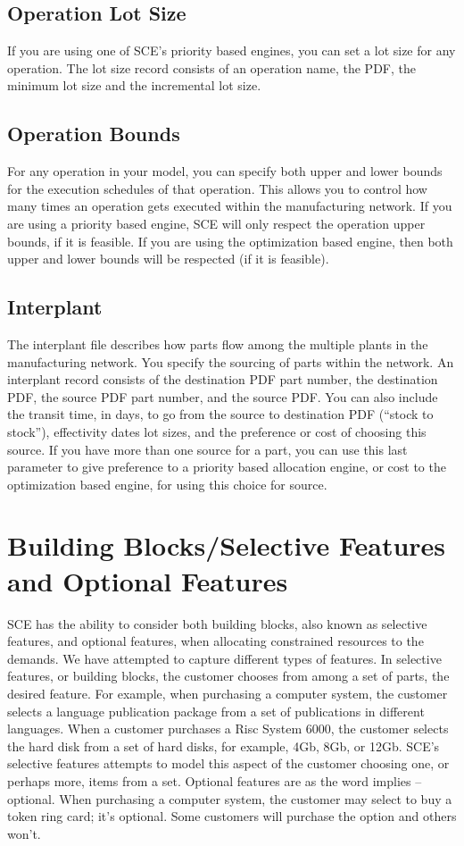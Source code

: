 \subsection{Operation Lot Size}
If you are using one of SCE's priority based engines, you can set a
lot size for any operation.  The lot size record consists of an
operation name, the PDF, the minimum lot size and the incremental lot
size.

\subsection{Operation Bounds}
For any operation in your model, you can specify both upper and lower
bounds for the execution schedules of that operation.  This allows you
to control how many times an operation gets executed within the
manufacturing network. 
If you are using a priority based engine, SCE
will only respect the operation upper bounds, if it is feasible.  If you are
using the optimization based engine, then both upper and lower 
bounds will be respected (if it is feasible).

\subsection{Interplant}
The interplant file describes how parts flow among the multiple plants
in the manufacturing network.  You specify the sourcing of parts
within the network.  An interplant record consists of the destination
PDF part number, the destination PDF, the source PDF part number, and
the source PDF.  You can also include the transit time, in days, to go
from the source to destination PDF (``stock to stock''), effectivity 
dates lot sizes, and
the preference or cost of choosing this source.  If you have more than
one source for a part, you can use this last parameter to give
preference to a priority based allocation engine, or cost to the
optimization based engine, for using this choice for source.

\section{Building Blocks/Selective Features and Optional Features}
SCE has the ability to consider both building blocks, also known as
selective features, and optional features, when allocating constrained
resources to the demands.  We have attempted to capture different
types of features.  In selective features, or building blocks, the
customer chooses from among a set of parts, the desired feature.  For
example, when purchasing a computer system, the customer selects a
language publication package from a set of publications in different
languages.  When a customer purchases a Risc System 6000, the
customer selects the hard disk from a set of hard disks, for example,
4Gb, 8Gb, or 12Gb.  SCE's selective features attempts to model this
aspect of the customer choosing one, or perhaps more, items from a
set.  Optional features are as the word implies -- optional.  When
purchasing a computer system, the customer may select to buy a token
ring card; it's optional.  Some customers will purchase the option and
others won't.

